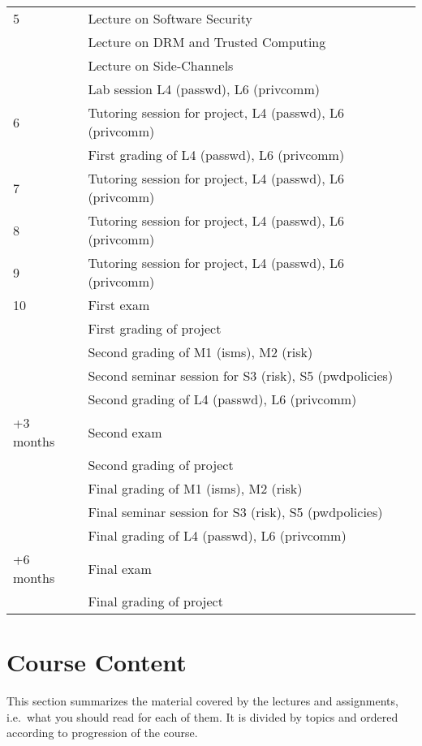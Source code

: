 \begin{table}
\begin{tabular}{lp{9cm}}
    \midrule
    5
      & Lecture on Software Security\\
      & Lecture on DRM and Trusted Computing\\
      & Lecture on Side-Channels\\
      & Lab session L4 (passwd), L6 (privcomm)\\
    \midrule
    6
      & Tutoring session for project, L4 (passwd), L6 (privcomm)\\
      & First grading of L4 (passwd), L6 (privcomm)\\
    \midrule
    7
      & Tutoring session for project, L4 (passwd), L6 (privcomm)\\
    \midrule
    8
      & Tutoring session for project, L4 (passwd), L6 (privcomm)\\
    \midrule
    9
      & Tutoring session for project, L4 (passwd), L6 (privcomm)\\
    \midrule
    10
      & First exam\\
      & First grading of project\\
      & Second grading of M1 (isms), M2 (risk)\\
      & Second seminar session for S3 (risk), S5 (pwdpolicies)\\
      & Second grading of L4 (passwd), L6 (privcomm)\\
    \midrule
    +3 months
      & Second exam\\
      & Second grading of project\\
      & Final grading of M1 (isms), M2 (risk)\\
      & Final seminar session for S3 (risk), S5 (pwdpolicies)\\
      & Final grading of L4 (passwd), L6 (privcomm)\\
    \midrule
    +6 months
      & Final exam\\
      & Final grading of project\\
    \bottomrule
  \end{tabular}
\end{table}


\section{Course Content}

This section summarizes the material covered by the lectures and assignments, 
i.e.~what you should read for each of them.
It is divided by topics and ordered according to progression of the course.

